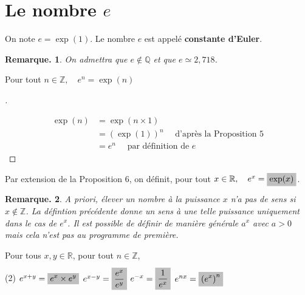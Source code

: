 \documentclass[12pt]{article}
\theoremstyle{break}
\newtheorem*{remark}{Remarque.}
\newenvironment{demo}[1][\proofname]{%
  \begin{proof}[#1]$ $\newline
  }{%
  \end{proof}
}
\begin{document}
\section{Le nombre $e$}
\begin{definition}{}{}
  On note $e=\exp (1)$. Le nombre $e$ est appelé \textbf{constante d'Euler}.
\end{definition}

\begin{remark}
  On admettra que $e \notin \mathbb{Q}$ et que $e \simeq 2,718$.
\end{remark}

\begin{proposition}{}{}
  Pour tout $n \in \mathbb{Z}, \quad e^{n}=\exp (n)$
\end{proposition}

\begin{demo}
  $$
  \begin{aligned}
    \exp (n) & =\exp (n \times 1) \\
    & =(\exp (1))^{n} \quad \text { d'après la Proposition 5}\\
    & =e^{n} \quad \text { par définition de } e
  \end{aligned}
  $$
\end{demo}

\begin{definition}{}{}
  Par extension de la Proposition 6, on définit, pour tout $x \in \mathbb{R}, \quad e^{x}=\hideM{\exp (x)}$.
\end{definition}

\begin{remark}
  \emph{A priori}, élever un nombre à la puissance $x$ n'a pas de sens si $x \notin \mathbb{Z}$. La défintion précédente donne un sens à une telle puissance uniquement dans le cas de $e^{x}$. Il est possible de définir de manière générale $a^{x}$ avec $a>0$ mais cela n'est pas au programme de première.
\end{remark}

\begin{proposition}{}{}
  Pour tous $x, y \in \mathbb{R}$, pour tout $n \in \mathbb{Z}$,

  \begin{tasks}[style=itemize](2)
    \task $e^{x+y}=\hideM{e^{x} \times e^{y}}$
    \task $e^{x-y}=\hideM{\dfrac{e^{x}}{e^{y}}}$
    \task $e^{-x}=\hideM{\dfrac{1}{e^{x}}}$
    \task $e^{n x}=\hideM{\left(e^{x}\right)^{n}}$
  \end{tasks}
\end{proposition}
\end{document}
